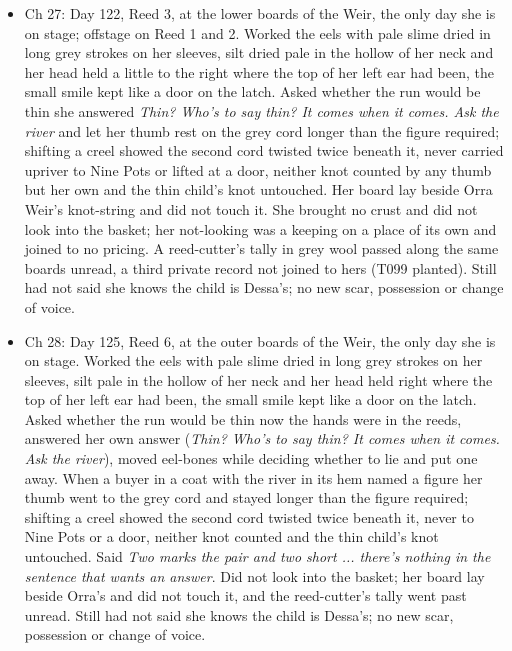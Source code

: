 \documentclass{design/chronicle}
\begin{document}
{\begin{itemize}[leftmargin=1.4em,itemsep=1pt,topsep=3pt,parsep=0pt]

\item Ch 27: Day 122, Reed 3, at the lower boards of the Weir, the only day she is on stage; offstage on Reed 1 and 2. Worked the eels with pale slime dried in long grey strokes on her sleeves, silt dried pale in the hollow of her neck and her head held a little to the right where the top of her left ear had been, the small smile kept like a door on the latch. Asked whether the run would be thin she answered \emph{Thin? Who’s to say thin? It comes when it comes. Ask the river} and let her thumb rest on the grey cord longer than the figure required; shifting a creel showed the second cord twisted twice beneath it, never carried upriver to Nine Pots or lifted at a door, neither knot counted by any thumb but her own and the thin child’s knot untouched. Her board lay beside Orra Weir’s knot-string and did not touch it. She brought no crust and did not look into the basket; her not-looking was a keeping on a place of its own and joined to no pricing. A reed-cutter’s tally in grey wool passed along the same boards unread, a third private record not joined to hers (T099 planted). Still had not said she knows the child is Dessa’s; no new scar, possession or change of voice.

\end{itemize}

\begin{itemize}[leftmargin=1.4em,itemsep=1pt,topsep=3pt,parsep=0pt]

\item Ch 28: Day 125, Reed 6, at the outer boards of the Weir, the only day she is on stage. Worked the eels with pale slime dried in long grey strokes on her sleeves, silt pale in the hollow of her neck and her head held right where the top of her left ear had been, the small smile kept like a door on the latch. Asked whether the run would be thin now the hands were in the reeds, answered her own answer (\emph{Thin? Who’s to say thin? It comes when it comes. Ask the river}), moved eel-bones while deciding whether to lie and put one away. When a buyer in a coat with the river in its hem named a figure her thumb went to the grey cord and stayed longer than the figure required; shifting a creel showed the second cord twisted twice beneath it, never to Nine Pots or a door, neither knot counted and the thin child’s knot untouched. Said \emph{Two marks the pair and two short ... there’s nothing in the sentence that wants an answer}. Did not look into the basket; her board lay beside Orra’s and did not touch it, and the reed-cutter’s tally went past unread. Still had not said she knows the child is Dessa’s; no new scar, possession or change of voice.


\end{itemize}}
\end{document}
